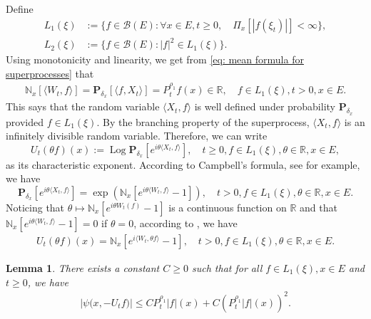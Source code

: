 \documentclass[12pt,a4paper]{amsart}
\theoremstyle{plain}
\newtheorem{lem}[thm]{Lemma}
\theoremstyle{definition}
\numberwithin{equation}{section}
\begin{document}
Define
\begin{align}
  L_1(\xi)
  &:= \{f\in \mathcal B(E): \forall x\in E, t\geq 0, \quad \Pi_x[|f(\xi_t)|]< \infty\}, \\
  L_2(\xi)
  &:= \{f \in \mathcal B(E): |f|^2 \in L_1(\xi)\}.
\end{align}
Using monotonicity and linearity, we get from \eqref{eq: mean formula for superprocesses}  that
\begin{align}
  \mathbb N_x[\langle W_t, f\rangle]
  = \mathbf P_{\delta_x}[\langle f, X_t\rangle]
  = P^{\rho_1}_t f(x) \in \mathbb R,
  \quad f\in L_1(\xi), t > 0,x\in E.
\end{align}
This says that the random variable $\langle X_t, f\rangle$ is well defined under probability $\mathbf P_{\delta_x}$ provided $f\in L_1(\xi)$.
By the branching property of the superprocess, $\langle X_t, f\rangle$ is an infinitely divisible random variable.
Therefore, we can write
\[
  U_t(\theta f)(x)
  := \operatorname{Log} \mathbf P_{\delta_x}[e^{i \theta \langle X_t, f\rangle}],
  \quad t\geq 0, f\in L_1(\xi), \theta \in \mathbb R, x\in E,
\]
as its characteristic exponent.
According to Campbell's formula, see \cite[Theorem 2.7]{Kyprianou2014Fluctuations} for example, we have
\[
  \mathbf P_{\delta_x} [e^{i\theta \langle X_t, f\rangle}]
  = \exp(\mathbb N_x[ e^{i\theta \langle W_t, f\rangle} - 1]),
  \quad t>0, f\in L_1(\xi), \theta \in \mathbb R, x\in E.
\]
Noticing that $\theta \mapsto \mathbb N_x[e^{i\theta W_t(f)} - 1]$ is a continuous function on $\mathbb R$ and that $\mathbb N_x[e^{i\theta \langle W_t, f\rangle} - 1] = 0$ if $\theta = 0$, according to \cite[Lemma 7.6]{Sato2013Levy}, we have
\begin{align}
  \label{eq: N and characteristic exponent}
  U_t(\theta f)(x)
  = \mathbb N_x[e^{i \langle W_t, \theta f\rangle} - 1],
  \quad t>0, f\in L_1(\xi), \theta \in \mathbb R, x\in E.
\end{align}

\begin{lem}
  There exists a constant $C\geq 0$ such that
  for all $f \in L_1(\xi),x\in E$ and $t\geq 0$, we have
  \begin{align}
    \label{eq: upper bound of psi(v)}
    \big|\psi\big(x,-U_tf\big)\big|
    \leq C P^{\rho_1}_t |f|(x) + C (P^{\rho_1}_t |f| (x))^2.
  \end{align}
\end{lem}
\end{document}

